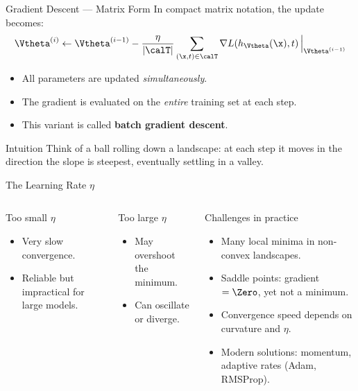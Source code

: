 \begin{frame}{Gradient Descent — Matrix Form}
  In compact matrix notation, the update becomes:
  \[
    \Vtheta^{(i)} \leftarrow \Vtheta^{(i-1)}
    - \frac{\eta}{|\calT|}\sum_{(\x,t)\in\calT}
      \nabla L\!\left(h_{\Vtheta}(\x), t\right)\Big|_{\Vtheta^{(i-1)}}
  \]

  \vspace{.4em}
  \begin{itemize}
    \item All parameters are updated \emph{simultaneously}.
    \item The gradient is evaluated on the \emph{entire} training set at each step.
    \item This variant is called \textbf{batch gradient descent}.
  \end{itemize}

  \vspace{.4em}
  \begin{exampleblock}{Intuition}
    Think of a ball rolling down a landscape: at each step it moves in the direction
    the slope is steepest, eventually settling in a valley.
  \end{exampleblock}
\end{frame}

\begin{frame}{The Learning Rate $\eta$}
  \begin{columns}[T]
    \begin{block}{Too small $\eta$}
      \begin{itemize}
        \item Very slow convergence.
        \item Reliable but impractical for large models.
      \end{itemize}
    \end{block}
    \vspace{.3em}
    \begin{block}{Too large $\eta$}
      \begin{itemize}
        \item May overshoot the minimum.
        \item Can oscillate or diverge.
      \end{itemize}
    \end{block}

    \begin{block}{Challenges in practice}
      \begin{itemize}
        \item Many local minima in non-convex landscapes.
        \item Saddle points: gradient $= \Zero$, yet not a minimum.
        \item Convergence speed depends on curvature and $\eta$.
        \item Modern solutions: momentum, adaptive rates (Adam, RMSProp).
      \end{itemize}
    \end{block}
  \end{columns}
\end{frame}

